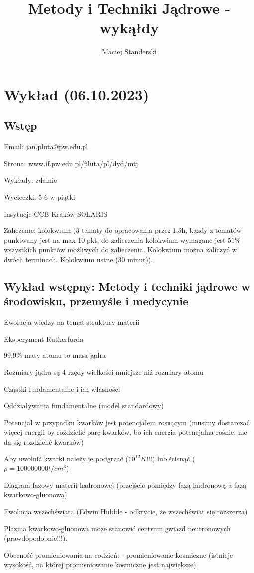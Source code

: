 \documentclass{article}
\title{Metody i Techniki Jądrowe - wykąłdy}
\author{Maciej Standerski}
\begin{document}
\maketitle

\section{Wykład (06.10.2023)}

\subsection{Wstęp}

Email: jan.pluta@pw.edu.pl

Strona: \href{https://www.if.pw.edu.pl/~pluta/pl/dyd/mtj/}{www.if.pw.edu.pl/\~pluta/pl/dyd/mtj}

Wykłady: zdalnie

Wycieczki: 5-6 w piątki

Insytucje
CCB Kraków
SOLARIS

Zaliczenie: kolokwium (3 tematy do opracowania przez 1,5h, każdy z tematów punktwany jest na max 10 pkt, do zalieczenia kolokwium wymagane jest $51\%$ wszystkich punktów możliwych do zalieczenia. Kolokwium można zaliczyć w dwóch terminach. Kolokwium ustne (30 minut)).

\subsection{Wykład wstępny: Metody i techniki jądrowe w środowisku, przemyśle i medycynie}

Ewolucja wiedzy na temat struktury materii

Eksperyment Rutherforda

99,9\% masy atomu to masa jądra

Rozmiary jądra są 4 rzędy wielkości mniejsze niż rozmiary atomu

Cząstki fundamentalne i ich własności

Oddziaływania fundamentalne (model standardowy)

Potencjał w przypadku kwarków jest potencjałem rosnącym (musimy dostarczać więcej energii by rozdzielić parę kwarków, bo ich energia potencjalna rośnie, nie da się rozdzielić kwarków)

Aby uwolnić kwarki należy je podgrzać ($10^{12} K$!!!) lub ścisnąć ($\rho = 100 000 000 t/cm^3$)

Diagram fazowy materii hadronowej (przejście pomiędzy fazą hadronową a fazą kwarkowo-gluonową)

Ewolucja wszechświata
(Edwin Hubble - odkrycie, że wszechświat się rozszerza)

Plazma kwarkowo-gluonowa może stanowić centrum gwiazd neutronowych (prawdopodobnie!!!).

Obecność promieniowania na codzień:
- promieniowanie kosmiczne (istnieje wysokość, na której promieniowanie kosmiczne jest największe)
\end{document}
